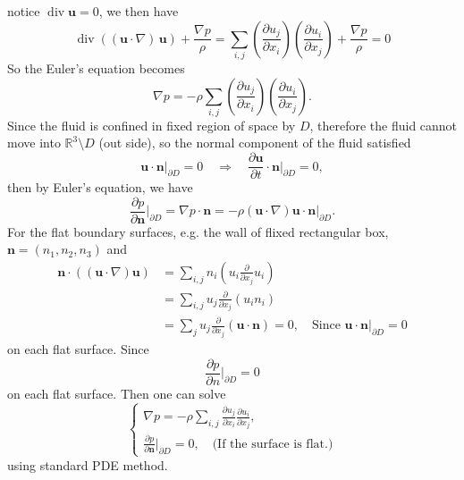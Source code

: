 notice $\operatorname{div}\textbf{u} = 0$, we then have
\begin{equation}
\operatorname{div}\left((\textbf{u}\cdot \nabla)\, \textbf{u}\right) + \frac{\nabla p}{\rho}
= \sum_{i,j}\left(\frac{\partial u_j}{\partial x_i}\right)\left(\frac{\partial u_i}{\partial x_j}\right) + \frac{\nabla p}{\rho} = 0
\end{equation}
So the Euler's equation becomes
\begin{equation}
\nabla p = -\rho\sum_{i,j}\left(\frac{\partial u_j}{\partial x_i}\right)\left(\frac{\partial u_i}{\partial x_j}\right).
\end{equation}
Since the fluid is confined in fixed region of space by $D$, therefore the fluid cannot move into $\mathbb{R}^3\setminus D$ (out side), so the normal component of the fluid satisfied 
\begin{equation}
\textbf{u}\cdot\textbf{n}\Bigg|_{\partial D} = 0
\quad\Rightarrow\quad
\frac{\partial \textbf{u}}{\partial t}\cdot \textbf{n}\Bigg|_{\partial D} = 0,
\end{equation}
then by Euler's equation, we have
\begin{equation}
\frac{\partial p}{\partial \textbf{n}}\Bigg|_{\partial D} = \nabla p \cdot \textbf{n} = -\rho (\textbf{u}\cdot\nabla)\textbf{u}\cdot \textbf{n}\Bigg|_{\partial D}.
\end{equation}
For the flat boundary surfaces, e.g. the wall of flixed rectangular box, $\textbf{n} = (n_1,n_2,n_3)$ and 
\begin{equation}
\begin{aligned}
\textbf{n}\cdot \left(\left(\textbf{u}\cdot \nabla\right)\textbf{u}\right)
&= \sum_{i,j} n_i \left(u_i\frac{\partial}{\partial x_j} u_i\right)\\
&= \sum_{i,j} u_j \frac{\partial}{\partial x_j}(u_in_i)\\
&= \sum_{j} u_j \frac{\partial}{\partial x_j}(\textbf{u}\cdot\textbf{n}) = 0,\quad \text{Since $\textbf{u}\cdot\textbf{n}\Bigg|_{\partial D} = 0$}
\end{aligned}
\end{equation}
on each flat surface. Since 
\begin{equation}
\frac{\partial p}{\partial n}\Bigg|_{\partial D} = 0
\end{equation}
on each flat surface. Then one can solve 
\begin{equation}
\begin{cases}
\displaystyle \nabla p = - \rho \sum_{i,j}\frac{\partial u_j}{\partial x_i}\frac{\partial u_i}{\partial x_j},\\
\displaystyle  \frac{\partial p}{\partial \textbf{n}}\Bigg|_{\partial D} = 0,\quad \text{(If the surface is flat.)}
\end{cases}
\end{equation}
using standard PDE method.

